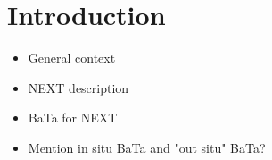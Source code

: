 \section{Introduction}

\begin{itemize}
\item General context
\item NEXT description
\item BaTa for NEXT
\item Mention in situ BaTa and "out situ" BaTa?
\end{itemize}

